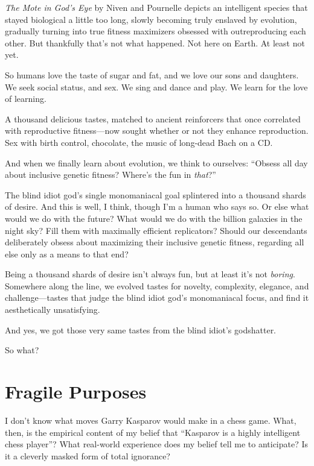 {
 \textit{The Mote in God's Eye} by Niven and
Pournelle depicts an intelligent species that stayed biological a
little too long, slowly becoming truly enslaved by evolution, gradually
turning into true fitness maximizers obsessed with outreproducing each
other. But thankfully that's not what happened. Not
here on Earth. At least not yet.}

{
 So humans love the taste of sugar and fat, and we love our sons
and daughters. We seek social status, and sex. We sing and dance and
play. We learn for the love of learning.}

{
 A thousand delicious tastes, matched to ancient reinforcers that
once correlated with reproductive fitness---now sought whether or not
they enhance reproduction. Sex with birth control, chocolate, the music
of long-dead Bach on a CD.}

{
 And when we finally learn about evolution, we think to ourselves:
``Obsess all day about inclusive genetic fitness?
Where's the fun in \textit{that}?''}

{
 The blind idiot god's single monomaniacal goal
splintered into a thousand shards of desire. And this is well, I think,
though I'm a human who says so. Or else what would we
do with the future? What would we do with the billion galaxies in the
night sky? Fill them with maximally efficient replicators? Should our
descendants deliberately obsess about maximizing their inclusive
genetic fitness, regarding all else only as a means to that end?}

{
 Being a thousand shards of desire isn't always
fun, but at least it's not \textit{boring}. Somewhere
along the line, we evolved tastes for novelty, complexity, elegance,
and challenge---tastes that judge the blind idiot god's
monomaniacal focus, and find it aesthetically unsatisfying.}

{
 And yes, we got those very same tastes from the blind
idiot's godshatter.}

{
 So what?}

\myendsectiontext

\chapter{Fragile Purposes}


{
 I don't know what moves Garry Kasparov would make
in a chess game. What, then, is the empirical content of my belief that
``Kasparov is a highly intelligent chess
player''? What real-world experience does my belief
tell me to anticipate? Is it a cleverly masked form of total ignorance?
}

